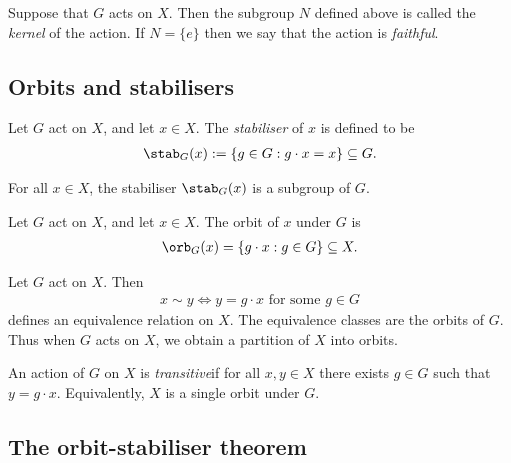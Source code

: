 \documentclass{article}
\begin{document}
\begin{definition}
    Suppose that $G$ acts on $X$. Then the subgroup $N$ defined above
    is called the \emph{kernel} of the action. If $N=\{e\}$ then we say that
    the action is \emph{faithful}.
\end{definition}

\subsection{Orbits and stabilisers}

\begin{definition}
    Let $G$ act on $X$, and let $x\in X$. The \emph{stabiliser} of $x$ is defined
    to be
    \begin{align*}
        \stab_G(x) :=\{g\in G:g\cdot x = x\}\subseteq G.
    \end{align*}
\end{definition}

\begin{lemma}
    For all $x\in X$, the stabiliser $\stab_G(x)$ is a subgroup of $G$.
\end{lemma}

\begin{definition}
    Let $G$ act on $X$, and let $x\in X$. The orbit of $x$ under $G$ is
    \begin{align*}
        \orb_G(x) = \{g\cdot x : g\in G\}\subseteq X.
    \end{align*}
\end{definition}

\begin{theorem}
    Let $G$ act on $X$. Then
    \begin{align*}
        x\sim y \Leftrightarrow y = g\cdot x \text{ for some }g\in G
    \end{align*}
    defines an equivalence relation on $X$. The equivalence classes are
    the orbits of $G$. Thus when $G$ acts on $X$, we obtain a partition
    of $X$ into orbits.
\end{theorem}

\setcounter{theorem}{6}
\begin{definition}
    An action of $G$ on $X$ is \emph{transitive}if for all $x,y\in X$
    there exists $g\in G$ such that $y=g\cdot x$. Equivalently, $X$
    is a single orbit under $G$.
\end{definition}

\subsection{The orbit-stabiliser theorem}
\end{document}
